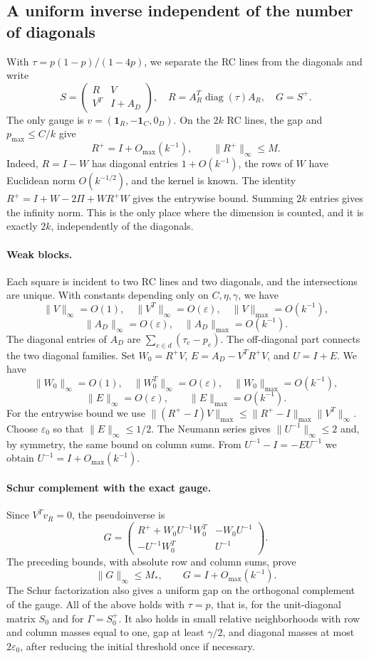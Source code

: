 \subsection{A uniform inverse independent of the number of diagonals}\label{sec:B5T02}
With $\tau=p(1-p)/(1-4p)$, we separate the RC lines from the diagonals and write
\[
 S=\begin{pmatrix}R&V\\V^T&I+A_D\end{pmatrix},\quad
 R=A_R^T\operatorname{diag}(\tau)A_R,\quad G=S^+.
\]
The only gauge is $v=(\mathbf1_R,-\mathbf1_C,0_D)$.
On the $2k$ RC lines, the gap and $p_{\max}\le C/k$ give
\[
 R^+=I+O_{\max}(k^{-1}),\qquad \|R^+\|_\infty\le M.
\]
Indeed, $R=I-W$ has diagonal entries $1+O(k^{-1})$, the rows of $W$
have Euclidean norm $O(k^{-1/2})$, and the kernel is known.
The identity $R^+=I+W-2\Pi+WR^+W$ gives the entrywise bound.
Summing $2k$ entries gives the infinity norm. This is the only place where the dimension
is counted, and it is exactly $2k$, independently of the diagonals.

\paragraph{Weak blocks.}
Each square is incident to two RC lines and two diagonals, and the intersections
are unique. With constants depending only on $C,\eta,\gamma$, we have
\[
 \|V\|_\infty=O(1),\quad \|V^T\|_\infty=O(\varepsilon),
 \quad \|V\|_{\max}=O(k^{-1}),
\]
\[
 \|A_D\|_\infty=O(\varepsilon),\quad \|A_D\|_{\max}=O(k^{-1}).
\]
The diagonal entries of $A_D$ are $\sum_{e\in d}(\tau_e-p_e)$.
The off-diagonal part connects the two diagonal families.
Set $W_0=R^+V$, $E=A_D-V^TR^+V$, and $U=I+E$.
We have
\[
 \|W_0\|_\infty=O(1),\quad\|W_0^T\|_\infty=O(\varepsilon),
 \quad\|W_0\|_{\max}=O(k^{-1}),
\]
\[
 \|E\|_\infty=O(\varepsilon),\qquad\|E\|_{\max}=O(k^{-1}).
\]
For the entrywise bound we use
$\|(R^+-I)V\|_{\max}\le\|R^+-I\|_{\max}\|V^T\|_\infty$.
Choose $\varepsilon_0$ so that $\|E\|_\infty\le1/2$.
The Neumann series gives $\|U^{-1}\|_\infty\le2$ and, by symmetry, the same bound on column sums.
From $U^{-1}-I=-EU^{-1}$ we obtain $U^{-1}=I+O_{\max}(k^{-1})$.

\paragraph{Schur complement with the exact gauge.}
Since $V^Tv_R=0$, the pseudoinverse is
\[
 G=\begin{pmatrix}
 R^++W_0U^{-1}W_0^T&-W_0U^{-1}\\
 -U^{-1}W_0^T&U^{-1}
 \end{pmatrix}.
\]
The preceding bounds, with absolute row and column sums, prove
\[
 \boxed{\|G\|_\infty\le M_*,\qquad G=I+O_{\max}(k^{-1}).}
\]
The Schur factorization also gives a uniform gap on the orthogonal complement of the gauge.
All of the above holds with $\tau=p$, that is, for the unit-diagonal matrix $S_0$ and for $\Gamma=S_0^+$.
It also holds in small relative neighborhoods with row and column masses equal to one,
gap at least $\gamma/2$, and diagonal masses at most $2\varepsilon_0$,
after reducing the initial threshold once if necessary.

